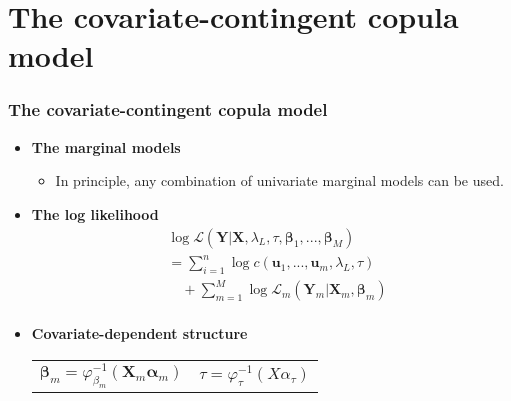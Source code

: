 \documentclass[14pt]{beamer}
\begin{document}
\section{The covariate-contingent copula model}


\begin{frame}
  \frametitle{The covariate-contingent copula model}
  \begin{itemize}
  \item \textbf{The marginal models}
    \begin{itemize}
    \item In principle, any combination of univariate marginal models can be
      used.
    \end{itemize}
  \item \textbf{The log likelihood}
    \begin{equation*}
      \begin{split}
        & \log \mathcal{L} (\bm{Y}| \bm{X},\lambda_L, \tau,\bm{\beta}_1,...,\bm{\beta}_M)\\ &=  \sum\nolimits_{i=1}^{n}
        \log c(\bm{u}_1,...,\bm{u}_m, \lambda_L, \tau)\\
& \hspace{1em}  + \sum\nolimits_{m=1}^M \log \mathcal{L}_m(\bm{Y}_m|\bm{X}_m,\bm{\beta}_m)\\
      \end{split}
    \end{equation*}
  \item \textbf{Covariate-dependent structure}

    \begin{center}
      \begin{tabular}{ll}
        $\bm{\beta}_m = \varphi_{\beta_m}^{-1}(\bm{X}_m\bm{\alpha}_m)$ &$\tau = \varphi_{\tau}^{-1}(X\alpha_{\tau})$ \\
      \end{tabular}
    \end{center}
  \end{itemize}
\end{frame}
\end{document}
